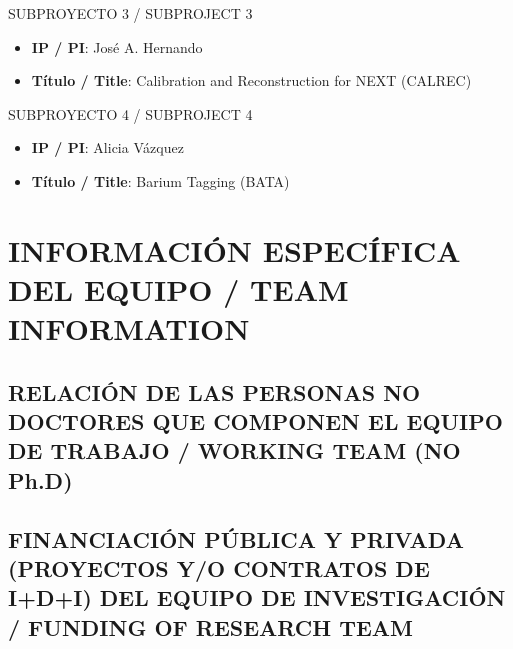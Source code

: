 \documentclass[a4paper,11pt,oneside]{article}
\begin{document}
{\sc SUBPROYECTO 3 / SUBPROJECT 3}

\begin{itemize}
\item {\bf IP / PI}: José A. Hernando
\item {\bf Título / Title}: Calibration and Reconstruction for NEXT (CALREC)
\end{itemize}

{\sc SUBPROYECTO 4 / SUBPROJECT 4}

\begin{itemize}
\item {\bf IP / PI}: Alicia Vázquez
\item {\bf Título / Title}: Barium Tagging  (BATA)
\end{itemize}

\newpage
\setcounter{page}{1}


\section{INFORMACIÓN ESPECÍFICA DEL EQUIPO / TEAM INFORMATION}


\subsection{RELACIÓN DE LAS PERSONAS NO DOCTORES QUE COMPONEN EL EQUIPO DE TRABAJO / WORKING TEAM (NO Ph.D) }



\subsection{FINANCIACIÓN PÚBLICA Y PRIVADA (PROYECTOS Y/O CONTRATOS DE I+D+I) DEL EQUIPO DE INVESTIGACIÓN / FUNDING OF RESEARCH TEAM}



\newpage
\setcounter{page}{1}

\end{document}
